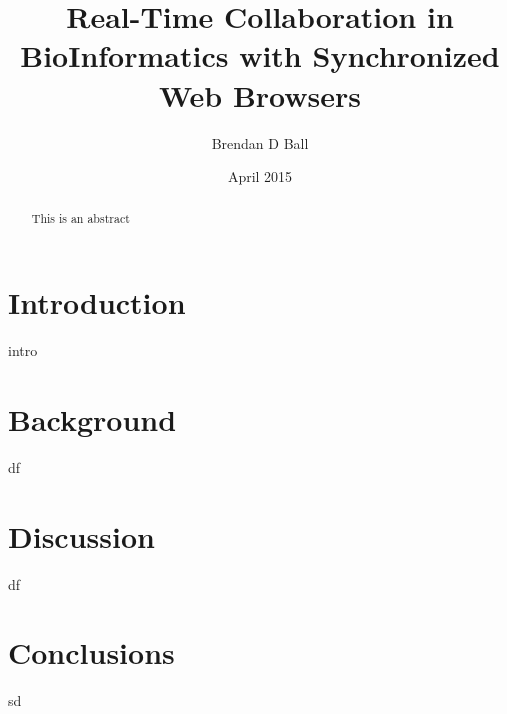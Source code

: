 \documentclass[prodmode,acmtecs]{acmsmall}
\begin{document}

\title{Real-Time Collaboration in BioInformatics with Synchronized Web Browsers} %
\author{Brendan D Ball
}
\date{April 2015}

\begin{abstract}
This is an abstract
\end{abstract}

\maketitle
\section{Introduction}
intro
\nocite{*}

\section{Background}
df
\section{Discussion}
df
\section{Conclusions}
sd
\appendix


\end{document}
